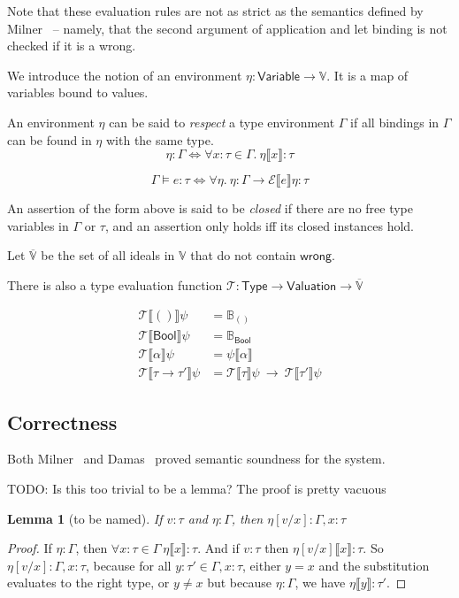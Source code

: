 Note that these evaluation rules are not as strict as the semantics
defined by Milner~\cite{milner1978} -- namely, that the second argument
of application and let binding is not checked if it is a \textsf{wrong}.

We introduce the notion of an environment $\eta : \mathsf{Variable} \rightarrow
\mathbb{V}$. It is a map of variables bound to values.

An environment $\eta$ can be said to \textit{respect} a type environment
$\Gamma$ if all bindings in $\Gamma$ can be found in $\eta$ with the same type.
$$\eta : \Gamma \iff \forall x : \tau \in \Gamma. \ \eta \llbracket x \rrbracket : \tau$$

$$\Gamma \vDash e : \tau \iff
\forall \eta. \ \eta : \Gamma \rightarrow \mathcal{E} \llbracket e \rrbracket \eta : \tau $$

An assertion of the form above is said to be \textit{closed} if there
are no free type variables in $\Gamma$ or $\tau$, and an assertion only holds
iff its closed instances hold.

Let $\overline{\mathbb{V}}$ be the set of all ideals in $\mathbb{V}$
that do not contain $\mathsf{wrong}$.

There is also a type evaluation function $\mathcal{T} : \mathsf{Type}
\rightarrow \mathsf{Valuation} \rightarrow \overline{\mathbb{V}}$

\begin{align*}
  \mathcal{T}\llbracket () \rrbracket\psi &= \mathbb{B}_{()} \\
  \mathcal{T}\llbracket \mathsf{Bool} \rrbracket \psi &= \mathbb{B}_{\mathsf{Bool}} \\
  \mathcal{T}\llbracket \alpha \rrbracket \psi &= \psi \llbracket \alpha \rrbracket \\
  \mathcal{T} \llbracket \tau \rightarrow \tau' \rrbracket \psi &= \mathcal{T}\llbracket \tau \rrbracket \psi \ \rightarrow \
                             \mathcal{T} \llbracket \tau' \rrbracket \psi
\end{align*}

\subsection{Correctness}

Both Milner~\cite{milner1978} and Damas~\cite{damas1982} proved semantic
soundness for the system.

TODO: Is this too trivial to be a lemma? The proof is pretty vacuous
\newtheorem{lemma}{Lemma}
\begin{lemma}[to be named]\label{lem:1}
  If $v : \tau$ and $\eta : \Gamma$, then $\eta[v/x] : \Gamma,x : \tau$
\end{lemma}
\begin{proof}
  If $\eta : \Gamma$, then $\forall x : \tau \in \Gamma \ \eta\llbracket x \rrbracket : \tau$.
  And if $v : \tau$ then $\eta[v/x] \llbracket x \rrbracket : \tau$.
  So $\eta[v/x] : \Gamma,x : \tau$, because for all $y : \tau' \in \Gamma,x : \tau$, either $y =
  x$ and the substitution evaluates to the right type, or $y \neq x$ but
  because $\eta : \Gamma$, we have $\eta \llbracket y \rrbracket : \tau'$.
\end{proof}


